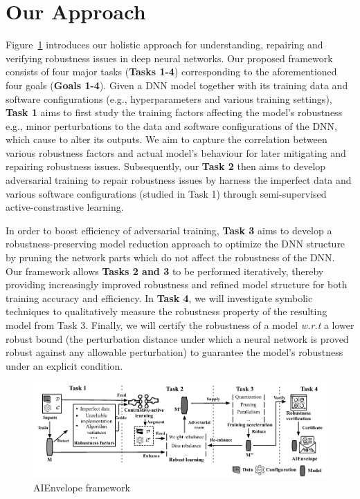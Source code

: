 \section{Our Approach}\label{back}
Figure~\ref{fig:figure1} introduces our holistic approach for understanding, repairing and verifying robustness issues in deep neural networks. 
Our proposed framework consists of four major tasks (\textbf{Tasks 1-4}) corresponding to the aforementioned four goals (\textbf{Goals  1-4}). 
Given a DNN model together with its training data and software configurations (e.g., hyperparameters and various training settings), \textbf{Task 1} aims to first study the training factors affecting the model's  robustness e.g., minor perturbations to the data and software configurations of the DNN, which cause to alter its outputs. We aim to capture the correlation between various robustness factors and actual model's behaviour for later mitigating and repairing robustness issues. Subsequently, our \textbf{Task 2} then aims to develop adversarial training to repair robustness issues by harness the imperfect data and various software configurations (studied in Task 1) through semi-supervised active-constrastive learning.

In order to boost efficiency of adversarial training, \textbf{Task 3} aims to develop a robustness-preserving model reduction approach to optimize the DNN structure by pruning the network parts which do not affect the robustness of the DNN. 
Our framework allows \textbf{Tasks 2 and 3} to be performed iteratively, thereby providing increasingly improved robustness and refined model structure for both training accuracy and efficiency.
In \textbf{Task 4}, we will investigate symbolic techniques to qualitatively measure the robustness property of the resulting model from Task 3. Finally, we will certify the robustness of a model \emph{w.r.t}  a lower robust bound (the perturbation distance under which a neural network is proved robust against any allowable perturbation) to  guarantee the model's robustness under an explicit condition. 

\begin{figure}[!t]
    \centering
    \includegraphics[width=\linewidth]{fig/approach-1.pdf}
    \caption{\mbox{AIEnvelope} framework}
    \label{fig:figure1}
\end{figure}
